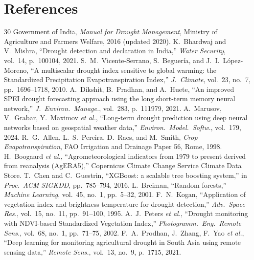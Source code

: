 \documentclass[11pt,a4paper,oneside]{article}
\begin{document}
\section*{References}
\begingroup
\footnotesize
\setlength{\parskip}{0pt}
\renewcommand{\section}[2]{}
\begin{thebibliography}{30}
\setlength{\itemsep}{0pt}
\setlength{\parsep}{0pt}
 Government of India, \textit{Manual for Drought Management}, Ministry of Agriculture and Farmers Welfare, 2016 (updated 2020).
 K.~Bhardwaj and V.~Mishra, ``Drought detection and declaration in India,'' \textit{Water Security}, vol.~14, p.~100104, 2021.
 S.~M.~Vicente-Serrano, S.~Beguer\'{i}a, and J.~I.~L\'{o}pez-Moreno, ``A multiscalar drought index sensitive to global warming: the Standardized Precipitation Evapotranspiration Index,'' \textit{J.\ Climate}, vol.~23, no.~7, pp.~1696--1718, 2010.
 A.~Dikshit, B.~Pradhan, and A.~Huete, ``An improved SPEI drought forecasting approach using the long short-term memory neural network,'' \textit{J.\ Environ.\ Manage.}, vol.~283, p.~111979, 2021.
 A.~Marusov, V.~Grabar, Y.~Maximov \textit{et al.}, ``Long-term drought prediction using deep neural networks based on geospatial weather data,'' \textit{Environ.\ Model.\ Softw.}, vol.~179, 2024.
 R.~G.~Allen, L.~S.~Pereira, D.~Raes, and M.~Smith, \textit{Crop Evapotranspiration}, FAO Irrigation and Drainage Paper 56, Rome, 1998.
 H.~Boogaard \textit{et al.}, ``Agrometeorological indicators from 1979 to present derived from reanalysis (AgERA5),'' Copernicus Climate Change Service Climate Data Store.
 T.~Chen and C.~Guestrin, ``XGBoost: a scalable tree boosting system,'' in \textit{Proc.\ ACM SIGKDD}, pp.~785--794, 2016.
 L.~Breiman, ``Random forests,'' \textit{Machine Learning}, vol.~45, no.~1, pp.~5--32, 2001.
 F.~N.~Kogan, ``Application of vegetation index and brightness temperature for drought detection,'' \textit{Adv.\ Space Res.}, vol.~15, no.~11, pp.~91--100, 1995.
 A.~J.~Peters \textit{et al.}, ``Drought monitoring with NDVI-based Standardized Vegetation Index,'' \textit{Photogramm.\ Eng.\ Remote Sens.}, vol.~68, no.~1, pp.~71--75, 2002.
 F.~A.~Prodhan, J.~Zhang, F.~Yao \textit{et al.}, ``Deep learning for monitoring agricultural drought in South Asia using remote sensing data,'' \textit{Remote Sens.}, vol.~13, no.~9, p.~1715, 2021.

\end{thebibliography}
\end{document}
